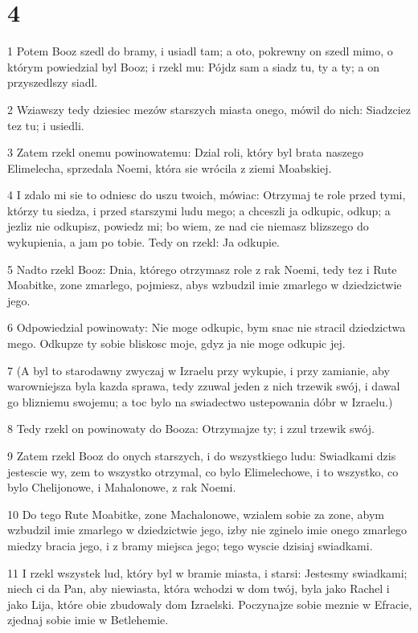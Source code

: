 \chapter{4}

\par 1 Potem Booz szedl do bramy, i usiadl tam; a oto, pokrewny on szedl mimo, o którym powiedzial byl Booz; i rzekl mu: Pójdz sam a siadz tu, ty a ty; a on przyszedlszy siadl.
\par 2 Wziawszy tedy dziesiec mezów starszych miasta onego, mówil do nich: Siadzciez tez tu; i usiedli.
\par 3 Zatem rzekl onemu powinowatemu: Dzial roli, który byl brata naszego Elimelecha, sprzedala Noemi, która sie wrócila z ziemi Moabskiej.
\par 4 I zdalo mi sie to odniesc do uszu twoich, mówiac: Otrzymaj te role przed tymi, którzy tu siedza, i przed starszymi ludu mego; a chceszli ja odkupic, odkup; a jezliz nie odkupisz, powiedz mi; bo wiem, ze nad cie niemasz blizszego do wykupienia, a jam po tobie. Tedy on rzekl: Ja odkupie.
\par 5 Nadto rzekl Booz: Dnia, którego otrzymasz role z rak Noemi, tedy tez i Rute Moabitke, zone zmarlego, pojmiesz, abys wzbudzil imie zmarlego w dziedzictwie jego.
\par 6 Odpowiedzial powinowaty: Nie moge odkupic, bym snac nie stracil dziedzictwa mego. Odkupze ty sobie bliskosc moje, gdyz ja nie moge odkupic jej.
\par 7 (A byl to starodawny zwyczaj w Izraelu przy wykupie, i przy zamianie, aby warowniejsza byla kazda sprawa, tedy zzuwal jeden z nich trzewik swój, i dawal go blizniemu swojemu; a toc bylo na swiadectwo ustepowania dóbr w Izraelu.)
\par 8 Tedy rzekl on powinowaty do Booza: Otrzymajze ty; i zzul trzewik swój.
\par 9 Zatem rzekl Booz do onych starszych, i do wszystkiego ludu: Swiadkami dzis jestescie wy, zem to wszystko otrzymal, co bylo Elimelechowe, i to wszystko, co bylo Chelijonowe, i Mahalonowe, z rak Noemi.
\par 10 Do tego Rute Moabitke, zone Machalonowe, wzialem sobie za zone, abym wzbudzil imie zmarlego w dziedzictwie jego, izby nie zginelo imie onego zmarlego miedzy bracia jego, i z bramy miejsca jego; tego wyscie dzisiaj swiadkami.
\par 11 I rzekl wszystek lud, który byl w bramie miasta, i starsi: Jestesmy swiadkami; niech ci da Pan, aby niewiasta, która wchodzi w dom twój, byla jako Rachel i jako Lija, które obie zbudowaly dom Izraelski. Poczynajze sobie meznie w Efracie, zjednaj sobie imie w Betlehemie.
